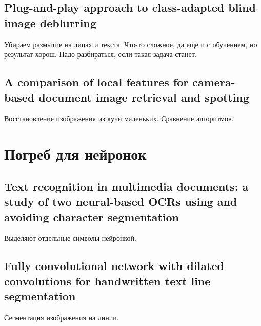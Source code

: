 \documentclass[12pt]{article}
\begin{document}
\subsection{Plug-and-play approach to class-adapted blind image deblurring}
Убираем размытие на лицах и текста. Что-то сложное, да еще и с обучением, но результат хорош.
Надо разбираться, если такая задача станет.


\subsection{A comparison of local features for camera-based document image retrieval and spotting}
Восстановление изображения из кучи маленьких. Сравнение алгоритмов. 



\section{Погреб для нейронок}

\subsection{Text recognition in multimedia documents: a study of two neural-based OCRs using and avoiding character segmentation}
Выделяют отдельные символы нейронкой.

\subsection{Fully convolutional network with dilated convolutions for handwritten text line segmentation}
Сегментация изображения на линии.
\end{document}
